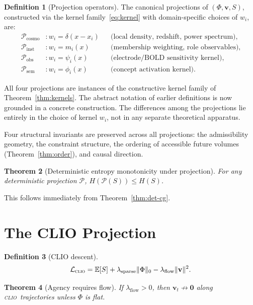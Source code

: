 \documentclass[12pt, oneside]{book}
\theoremstyle{plain}
\newtheorem{theorem}{Theorem}[chapter]
\theoremstyle{definition}
\newtheorem{definition}[theorem]{Definition}
\newcommand{\vfield}{\mathbf{v}}
\newcommand{\CLIO}{\textsc{clio}}
\begin{document}
\begin{definition}[Projection operators]
The canonical projections of $(\Phi, \vfield, S)$, constructed via the kernel
family~\eqref{eq:kernel} with domain-specific choices of $w_i$, are:
\begin{align*}
  \mathcal{P}_{\mathrm{cosmo}} &: w_i = \delta(x-x_i)
    &&\text{(local density, redshift, power spectrum)},\\
  \mathcal{P}_{\mathrm{inst}} &: w_i = m_i(x)
    &&\text{(membership weighting, role observables)},\\
  \mathcal{P}_{\mathrm{obs}} &: w_i = \psi_i(x)
    &&\text{(electrode/BOLD sensitivity kernel)},\\
  \mathcal{P}_{\mathrm{sem}} &: w_i = \phi_i(x)
    &&\text{(concept activation kernel)}.
\end{align*}
\end{definition}

All four projections are instances of the constructive kernel family of
Theorem~\ref{thm:kernels}. The abstract notation of earlier definitions is now
grounded in a concrete construction. The differences among the projections lie
entirely in the choice of kernel $w_i$, not in any separate theoretical apparatus.

Four structural invariants are preserved across all projections: the admissibility
geometry, the constraint structure, the ordering of accessible future volumes
(Theorem~\ref{thm:order}), and causal direction.

\begin{theorem}[Deterministic entropy monotonicity under projection]
For any deterministic projection $\mathcal{P}$,
$H(\mathcal{P}(S)) \leq H(S)$.
\end{theorem}

This follows immediately from Theorem~\ref{thm:det-cg}.

\section{The CLIO Projection}
\label{sec:clio}

\begin{definition}[CLIO descent]
\[
  \mathcal{L}_{\CLIO} = \mathbb{E}[S] + \lambda_{\mathrm{sparse}}\|\Phi\|_0
    - \lambda_{\mathrm{flow}}\|\vfield\|^2.
\]
\end{definition}

\begin{theorem}[Agency requires flow]
If $\lambda_{\mathrm{flow}} > 0$, then $\vfield_t \not\to \mathbf{0}$ along \CLIO\
trajectories unless $\Phi$ is flat.
\end{theorem}
\end{document}
